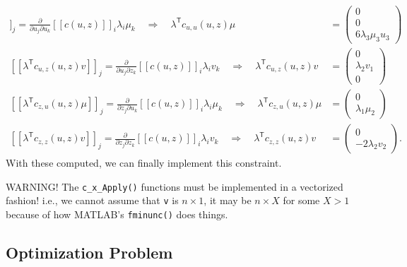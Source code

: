 \documentclass{article}
\newcommand{\trp}{^{\mathsf{T}}}
\begin{document}
\begin{align*}
    [\![\lambda\trp c_{u,u}(u,z)\mu]\!]_{j}
    = \frac{\partial}{\partial u_{j}\partial u_{k}}[\![c(u,z)]\!]_{i}\lambda_{i}\mu_{k}
    \quad\Longrightarrow\quad
    \lambda\trp c_{u,u}(u,z)\mu
    &= \left(\begin{array}{c}
        0 \\ 0 \\ 6\lambda_{3}\mu_{3}u_{3}
    \end{array}\right)
    \\
    [\![\lambda\trp c_{u,z}(u,z)v]\!]_{j}
    = \frac{\partial}{\partial u_{j}\partial z_{k}}[\![c(u,z)]\!]_{i}\lambda_{i}v_{k}
    \quad\Longrightarrow\quad
    \lambda\trp c_{u,z}(u,z)v
    &= \left(\begin{array}{c}
        0 \\ \lambda_{2} v_{1} \\ 0
    \end{array}\right)
    \\
    [\![\lambda\trp c_{z,u}(u,z)\mu]\!]_{j}
    = \frac{\partial}{\partial z_{j}\partial u_{k}}[\![c(u,z)]\!]_{i}\lambda_{i}\mu_{k}
    \quad\Longrightarrow\quad
    \lambda\trp c_{z,u}(u,z)\mu
    &= \left(\begin{array}{c}
        0 \\ \lambda_{1}\mu_{2}
    \end{array}\right)
    \\
    [\![\lambda\trp c_{z,z}(u,z)v]\!]_{j}
    = \frac{\partial}{\partial z_{j}\partial z_{k}}[\![c(u,z)]\!]_{i}\lambda_{i}v_{k}
    \quad\Longrightarrow\quad
    \lambda\trp c_{z,z}(u,z)v
    &= \left(\begin{array}{c}
        0 \\ -2\lambda_{2}v_{2}
    \end{array}\right).
\end{align*}
With these computed, we can finally implement this constraint.



{\color{red}
WARNING! The \texttt{c\_x\_Apply()} functions must be implemented in a vectorized fashion! i.e., we cannot assume that \texttt{v} is $n \times 1$, it may be $n \times X$ for some $X > 1$ because of how MATLAB's \texttt{fminunc()} does things.
}

\subsection*{Optimization Problem}
\end{document}
